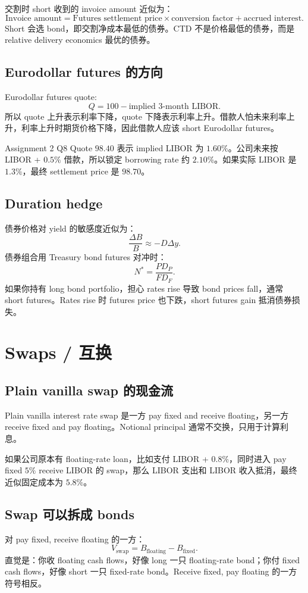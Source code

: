交割时 short 收到的 invoice amount 近似为：
\[
\text{Invoice amount}=\text{Futures settlement price}\times\text{conversion factor}+\text{accrued interest}.
\]
Short 会选  bond，即交割净成本最低的债券。CTD 不是价格最低的债券，而是 relative delivery economics 最优的债券。

\subsection{Eurodollar futures 的方向}
Eurodollar futures quote:
\[
Q=100-\text{implied 3-month LIBOR}.
\]
所以 quote 上升表示利率下降，quote 下降表示利率上升。借款人怕未来利率上升，利率上升时期货价格下降，因此借款人应该 short Eurodollar futures。

\begin{examplebox}{Assignment 2 Q8}
Quote $98.40$ 表示 implied LIBOR 为 $1.60\%$。公司未来按 LIBOR + $0.5\%$ 借款，所以锁定 borrowing rate 约 $2.10\%$。如果实际 LIBOR 是 $1.3\%$，最终 settlement price 是 $98.70$。
\end{examplebox}

\subsection{Duration hedge}
债券价格对 yield 的敏感度近似为：
\[
\frac{\Delta B}{B}\approx-D\Delta y.
\]
债券组合用 Treasury bond futures 对冲时：
\[
N^\ast=\frac{PD_P}{FD_F}.
\]
如果你持有 long bond portfolio，担心 rates rise 导致 bond prices fall，通常 short futures。Rates rise 时 futures price 也下跌，short futures gain 抵消债券损失。

\section{Swaps / 互换}

\subsection{Plain vanilla swap 的现金流}
Plain vanilla interest rate swap 是一方 pay fixed and receive floating，另一方 receive fixed and pay floating。Notional principal 通常不交换，只用于计算利息。

如果公司原本有 floating-rate loan，比如支付 LIBOR + $0.8\%$，同时进入 pay fixed $5\%$ receive LIBOR 的 swap，那么 LIBOR 支出和 LIBOR 收入抵消，最终近似固定成本为 $5.8\%$。

\subsection{Swap 可以拆成 bonds}
对 pay fixed, receive floating 的一方：
\[
V_{\text{swap}}=B_{\text{floating}}-B_{\text{fixed}}.
\]
直觉是：你收 floating cash flows，好像 long 一只 floating-rate bond；你付 fixed cash flows，好像 short 一只 fixed-rate bond。Receive fixed, pay floating 的一方符号相反。

